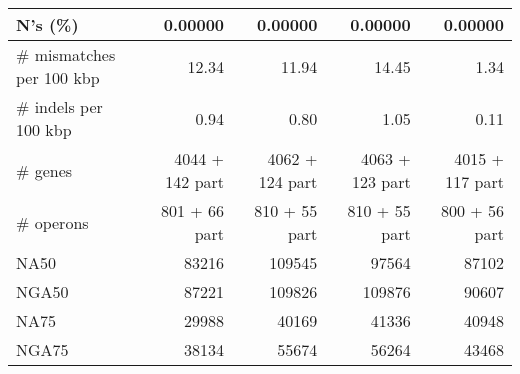 \begin{table}[ht]
\begin{center}
\begin{tabular}{|l*{4}{|r}|}
N's (\%) & 0.00000 & 0.00000 & 0.00000 & 0.00000 \\ \hline
\# mismatches per 100 kbp & 12.34 & 11.94 & 14.45 & 1.34 \\ \hline
\# indels per 100 kbp & 0.94 & 0.80 & 1.05 & 0.11 \\ \hline
\# genes & 4044 + 142 part & 4062 + 124 part & 4063 + 123 part & 4015 + 117 part \\ \hline
\# operons & 801 + 66 part & 810 + 55 part & 810 + 55 part & 800 + 56 part \\ \hline
NA50 & 83216 & 109545 & 97564 & 87102 \\ \hline
NGA50 & 87221 & 109826 & 109876 & 90607 \\ \hline
NA75 & 29988 & 40169 & 41336 & 40948 \\ \hline
NGA75 & 38134 & 55674 & 56264 & 43468 \\ \hline
\end{tabular}
\end{center}
\end{table}
